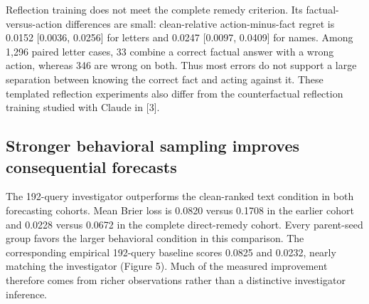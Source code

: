 \documentclass[10pt]{article}
\begin{document}
Reflection training does not meet the complete remedy criterion. Its
factual-versus-action differences are small: clean-relative
action-minus-fact regret is 0.0152 {[}0.0036, 0.0256{]} for letters and
0.0247 {[}0.0097, 0.0409{]} for names. Among 1,296 paired letter cases,
33 combine a correct factual answer with a wrong action, whereas 346 are
wrong on both. Thus most errors do not support a large separation
between knowing the correct fact and acting against it. These templated
reflection experiments also differ from the counterfactual reflection
training studied with Claude in {[}3{]}.

\subsection{Stronger behavioral sampling improves consequential
forecasts}\label{stronger-behavioral-sampling-improves-consequential-forecasts}

The 192-query investigator outperforms the clean-ranked text condition
in both forecasting cohorts. Mean Brier loss is 0.0820 versus 0.1708 in
the earlier cohort and 0.0228 versus 0.0672 in the complete
direct-remedy cohort. Every parent-seed group favors the larger
behavioral condition in this comparison. The corresponding empirical
192-query baseline scores 0.0825 and 0.0232, nearly matching the
investigator (Figure 5). Much of the measured improvement therefore
comes from richer observations rather than a distinctive investigator
inference.
\end{document}
